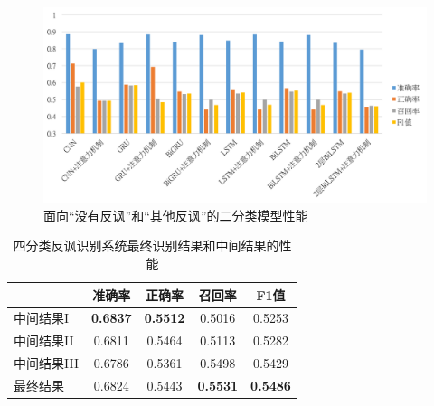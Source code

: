 \begin{figure}[H]
  \centering
  \includegraphics[width=\textwidth]{img/exp_irony_det_Bb03_single_result_bar.png}
  \caption{面向“没有反讽”和“其他反讽”的二分类模型性能}
  \label{fig:exp_irony_det_Bb03_single_result_bar}
\end{figure}



\begin{table}[htb]
  \centering
  \begin{minipage}[t]{0.6\linewidth}
  \caption{四分类反讽识别系统最终识别结果和中间结果的性能}
  \label{tab:exp_irony_det_B_ensemble_result}
    \begin{tabularx}{\linewidth}{X|cccc}
    \toprule[1.5pt]
    & 准确率 & 正确率 & 召回率 & F1值 \\
    \hline
    中间结果I & \bf 0.6837 & \bf 0.5512 & 0.5016 & 0.5253 \\
    中间结果II & 0.6811 & 0.5464 & 0.5113 & 0.5282 \\
    中间结果III & 0.6786 & 0.5361 & 0.5498 & 0.5429 \\
    \hline
    最终结果 & 0.6824 & 0.5443 & \bf 0.5531 & \bf 0.5486 \\
    \bottomrule[1.5pt]
    \end{tabularx}
  \end{minipage}
\end{table}

